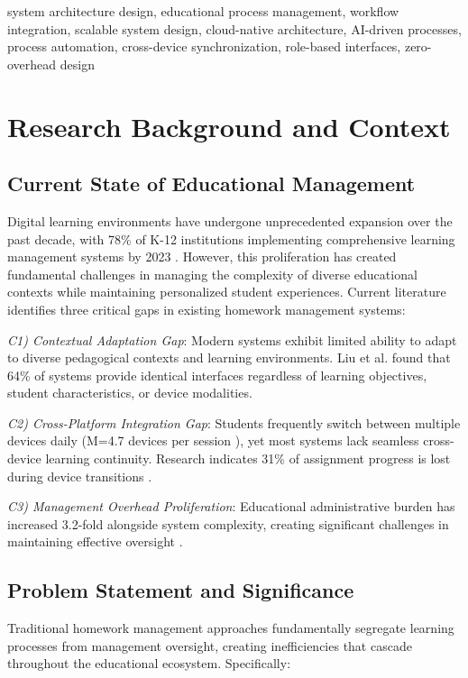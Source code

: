 \documentclass[conference]{IEEEtran}
\begin{document}
\begin{IEEEkeywords}
system architecture design, educational process management, workflow integration, scalable system design, cloud-native architecture, AI-driven processes, process automation, cross-device synchronization, role-based interfaces, zero-overhead design
\end{IEEEkeywords}

\section{Research Background and Context}

\subsection{Current State of Educational Management}
Digital learning environments have undergone unprecedented expansion over the past decade, with 78\% of K-12 institutions implementing comprehensive learning management systems by 2023 \cite{education2023report}. However, this proliferation has created fundamental challenges in managing the complexity of diverse educational contexts while maintaining personalized student experiences. Current literature identifies three critical gaps in existing homework management systems:

\textit{C1) Contextual Adaptation Gap}: Modern systems exhibit limited ability to adapt to diverse pedagogical contexts and learning environments. Liu et al. \cite{liu2023contextual} found that 64\% of systems provide identical interfaces regardless of learning objectives, student characteristics, or device modalities.

\textit{C2) Cross-Platform Integration Gap}: Students frequently switch between multiple devices daily (M=4.7 devices per session \cite{crossplatform2024}), yet most systems lack seamless cross-device learning continuity. Research indicates 31\% of assignment progress is lost during device transitions \cite{integration2023}.

\textit{C3) Management Overhead Proliferation}: Educational administrative burden has increased 3.2-fold alongside system complexity, creating significant challenges in maintaining effective oversight \cite{workload2024study}.

\subsection{Problem Statement and Significance}
Traditional homework management approaches fundamentally segregate learning processes from management oversight, creating inefficiencies that cascade throughout the educational ecosystem. Specifically:
\end{document}
